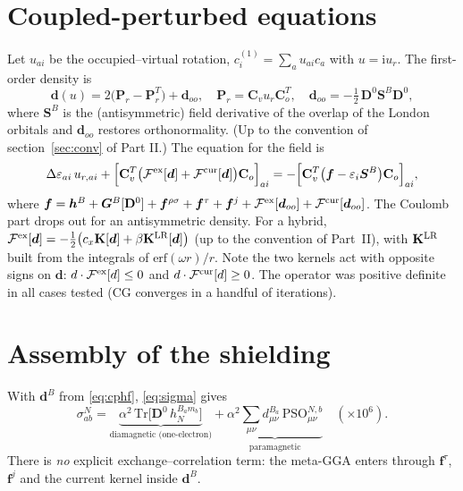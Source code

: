 \documentclass[11pt,a4paper]{article}
\newcommand{\Dm}{\mathbf{D}}
\newcommand{\ci}{\mathrm{i}}
\begin{document}
\section{Coupled-perturbed equations}\label{sec:cphf}

Let $u_{ai}$ be the occupied--virtual rotation, $c^{(1)}_i=\sum_a u_{ai}c_a$ with $u=\ci u_r$. The first-order density is
\begin{equation}
\bm d(u)=2\big(\mathbf P_r-\mathbf P_r^{T}\big)+\bm d_{oo},\quad \mathbf P_r=\mathbf C_v u_r\mathbf C_o^T,\quad \bm d_{oo}=-\tfrac12\,\Dm^0\bm S^{B}\Dm^0 ,
\end{equation}
where $\bm S^B$ is the (antisymmetric) field derivative of the overlap of the London orbitals and $\bm d_{oo}$ restores orthonormality. (Up to the convention of section~\ref{sec:conv} of Part II.) The equation for the field is
\begin{equation}
\Delta\varepsilon_{ai}\,u_{r,ai}+\Big[\mathbf C_v^T\big(\mathcal F^{\rm ex}[\bm d]+\mathcal F^{\rm cur}[\bm d]\big)\mathbf C_o\Big]_{ai}
=-\Big[\mathbf C_v^T\big(\bm f-\varepsilon_i\bm S^B\big)\mathbf C_o\Big]_{ai},
\label{eq:cphf}
\end{equation}
where $\bm f=\bm h^B+\bm G^B[\Dm^0]+\bm f^{\rho\sigma}+\bm f^{\tau}+\bm f^{j}+\mathcal F^{\rm ex}[\bm d_{oo}]+\mathcal F^{\rm cur}[\bm d_{oo}]$. The Coulomb part drops out for an antisymmetric density. For a hybrid, $\mathcal F^{\rm ex}[\bm d]=-\tfrac12\big(c_x\mathbf K[\bm d]+\beta\mathbf K^{\rm LR}[\bm d]\big)$ (up to the convention of Part~II), with $\mathbf K^{\rm LR}$ built from the integrals of $\mathrm{erf}(\omega r)/r$. Note the two kernels act with opposite signs on $\bm d$: $d\cdot\mathcal F^{\rm ex}[d]\le0$ and $d\cdot\mathcal F^{\rm cur}[d]\ge0$. The operator was positive definite in all cases tested (CG converges in a handful of iterations).

\section{Assembly of the shielding}

With $\bm d^{B}$ from \eqref{eq:cphf}, \eqref{eq:sigma} gives
\begin{equation}
\sigma^N_{ab}=\underbrace{\alpha^2\,\mathrm{Tr}\big[\Dm^0\,h^{B_a m_b}_N\big]}_{\text{diamagnetic (one-electron)}}
+\underbrace{\alpha^2\sum_{\mu\nu}d^{B_a}_{\mu\nu}\,\mathrm{PSO}^{N,b}_{\mu\nu}}_{\text{paramagnetic}}
\quad(\times10^6).
\end{equation}
There is \emph{no} explicit exchange--correlation term: the meta-GGA enters through $\bm f^{\tau}$, $\bm f^{j}$ and the current kernel inside $\bm d^B$.
\end{document}
